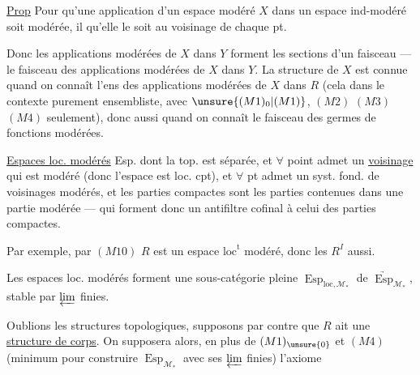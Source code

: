 \uline{Prop} Pour qu'une application d'un espace modéré $X$ dans un espace ind-modéré soit modérée, il  qu'elle le soit au voisinage de chaque pt.

Donc les applications modérées de $X$ dans $Y$ forment les sections d'un faisceau --- le faisceau des applications modérées de $X$ dans $Y$. La structure  de $X$ est connue quand on connaît l'ens des applications modérées de $X$ dans $R$ (cela  dans le contexte purement ensembliste, avec $\unsure{(M1)_0|(M1)}$, $(M2)$ $(M3)$ $(M4)$ seulement), donc aussi quand on connaît le faisceau des germes de fonctions modérées.

\uline{Espaces loc. modérés} Esp.   dont la top. est  séparée, et $\forall$ point admet un \uline{voisinage} qui est  modéré (donc l'espace est loc. cpt), et $\forall$ pt admet un syst. fond. de voisinages modérés, et les parties compactes sont les parties contenues dans une partie modérée --- qui forment donc un antifiltre cofinal à celui des parties compactes.

Par exemple, par $(M10)$ $R$ est un espace $\mathrm{loc}^{\mathrm t}$ modéré, donc les $R^I$ aussi.

Les espaces loc. modérés  forment une sous-catégorie pleine $\operatorname{Esp}_{\mathrm{loc},\mathcal M_*}$ de $\underrightarrow{\operatorname{Esp}}_{\mathcal M_*}$, stable par $\varprojlim$ finies.


Oublions les structures topologiques, supposons par contre que $R$ ait une \uline{structure de corps}. On supposera alors,  en plus de $(M1)_{\unsure{0}}$ et $(M4)$ (minimum pour construire $\operatorname{Esp}_{\mathcal M_*}$ avec ses $\varprojlim$ finies) l'axiome

